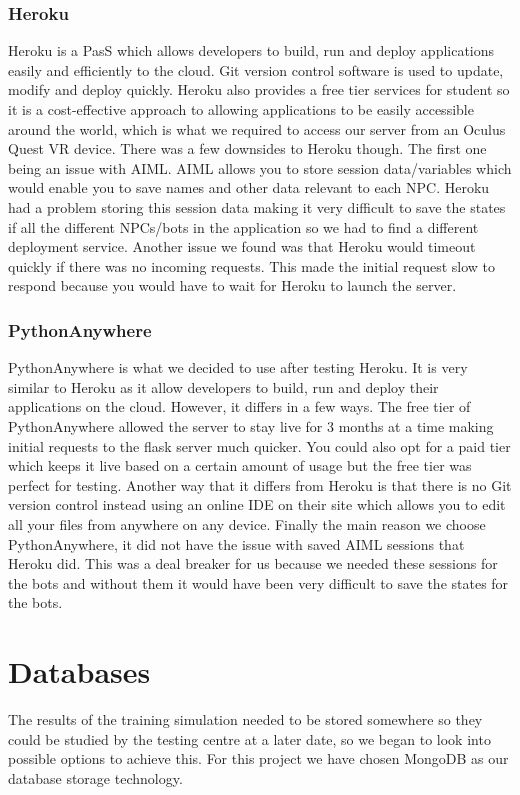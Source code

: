 \subsubsection{Heroku}
Heroku is a PasS which allows developers to build, run and deploy applications easily and efficiently to the cloud. Git version control software is used to update, modify and deploy quickly. Heroku also provides a free tier services for student so it is a cost-effective approach to allowing applications to be easily accessible around the world, which is what we required to access our server from an Oculus Quest VR device. There was a few downsides to Heroku though. The first one being an issue with AIML. AIML allows you to store session data/variables which would enable you to save names and other data relevant to each NPC. Heroku had a problem storing this session data making it very difficult to save the states if all the different NPCs/bots in the application so we had to find a different deployment service. Another issue we found was that Heroku would timeout quickly if there was no incoming requests. This made the initial request slow to respond because you would have to wait for Heroku to launch the server.

\subsubsection{PythonAnywhere}
PythonAnywhere is what we decided to use after testing Heroku. It is very similar to Heroku as it allow developers to build, run and deploy their applications on the cloud. However, it differs in a few ways. The free tier of PythonAnywhere allowed the server to stay live for 3 months at a time making initial requests to the flask server much quicker. You could also opt for a paid tier which keeps it live based on a certain amount of usage but the free tier was perfect for testing. Another way that it differs from Heroku is that there is no Git version control instead using an online IDE on their site which allows you to edit all your files from anywhere on any device. Finally the main reason we choose PythonAnywhere, it did not have the issue with saved AIML sessions that Heroku did. This was a deal breaker for us because we needed these sessions for the bots and without them it would have been very difficult to save the states for the bots. 

\section{Databases}
The results of the training simulation needed to be stored somewhere so they could be studied by the testing centre at a later date, so we began to look into possible options to achieve this. For this project we have chosen MongoDB as our database storage technology.

